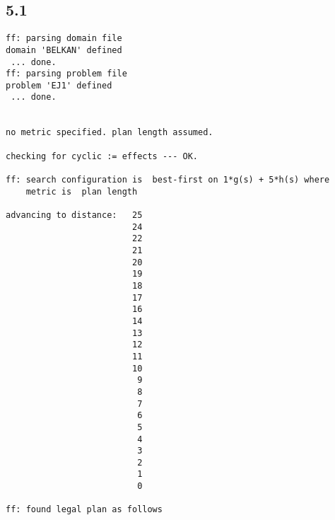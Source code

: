 \documentclass{article}
\begin{document}
\subsection*{5.1}
\begin{lstlisting}
ff: parsing domain file
domain 'BELKAN' defined
 ... done.
ff: parsing problem file
problem 'EJ1' defined
 ... done.


no metric specified. plan length assumed.

checking for cyclic := effects --- OK.

ff: search configuration is  best-first on 1*g(s) + 5*h(s) where
    metric is  plan length

advancing to distance:   25
                         24
                         22
                         21
                         20
                         19
                         18
                         17
                         16
                         14
                         13
                         12
                         11
                         10
                          9
                          8
                          7
                          6
                          5
                          4
                          3
                          2
                          1
                          0

ff: found legal plan as follows


\end{lstlisting}
\end{document}
